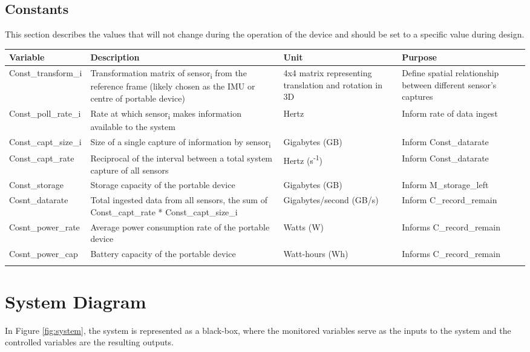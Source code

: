 \documentclass[11pt]{article}
\begin{document}
		
			\subsection{Constants} 
			This section describes the values that will not change during the operation of the device and should be set to a specific value during design.
			
			\begin{tabularx}{\textwidth}{X X X X}
				\toprule
				\textbf{Variable} & \textbf{Description} & \textbf{Unit} & \textbf{Purpose}\\
				\midrule
				Const\_transform\_i & Transformation matrix of sensor\textsubscript{i} from the reference frame (likely chosen as the IMU or centre of portable device) & 4x4 matrix representing translation and rotation in 3D & Define spatial relationship between different sensor's captures \\
				\midrule
				Const\_poll\_rate\_i & Rate at which sensor\textsubscript{i} makes information available to the system & Hertz & Inform rate of data ingest\\
				\midrule
				Const\_capt\_size\_i & Size of a single capture of information by sensor\textsubscript{i} & Gigabytes (GB) & Inform Const\_datarate \\
				\midrule
				Const\_capt\_rate & Reciprocal of the interval between a total system capture of all sensors & Hertz (s\textsuperscript{-1}) & Inform Const\_datarate \\
				\midrule
				Const\_storage & Storage capacity of the portable device & Gigabytes (GB) & Inform M\_storage\_left \\
				\midrule
				Cosnt\_datarate & Total ingested data from all sensors, the sum of Const\_capt\_rate * Const\_capt\_size\_i &Gigabytes/second (GB/s) & Inform C\_record\_remain \\
				\midrule
				Cosnt\_power\_rate & Average power consumption rate of the portable device & Watts (W) & Informs C\_record\_remain \\
				\midrule
				Cosnt\_power\_cap & Battery capacity of the portable device & Watt-hours (Wh) & Informs C\_record\_remain  \\
				\bottomrule
				\caption{Constants and its description}
			\end{tabularx}

		
		\section{System Diagram}
			In Figure \ref{fig:system}, the system is represented as a black-box, where the monitored variables serve as the inputs to the system and the controlled variables are the resulting outputs.
			
\end{document}
